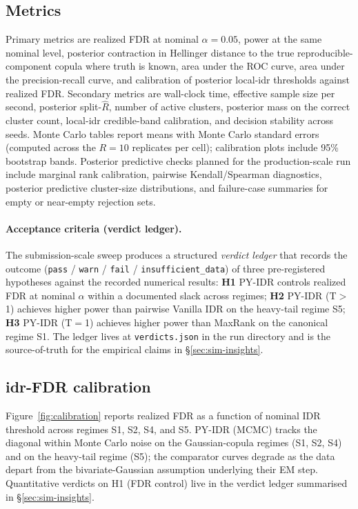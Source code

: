 \subsection{Metrics}
\label{sec:sim-metrics}

Primary metrics are realized FDR at nominal $\alpha=0.05$, power at the same
nominal level, posterior contraction in Hellinger distance to the true
reproducible-component copula where truth is known, area under the ROC curve,
area under the precision-recall curve, and calibration of posterior local-idr
thresholds against realized FDR. Secondary metrics are wall-clock time,
effective sample size per second, posterior split-$\widehat R$, number of
active clusters, posterior mass on the correct cluster count, local-idr
credible-band calibration, and decision stability across seeds. Monte Carlo
tables report means with Monte Carlo standard errors (computed across the
$R=10$ replicates per cell); calibration plots include 95\% bootstrap bands.
Posterior predictive checks planned for the production-scale run include
marginal rank calibration, pairwise Kendall/Spearman diagnostics, posterior
predictive cluster-size distributions, and failure-case summaries for empty
or near-empty rejection sets.

\paragraph{Acceptance criteria (verdict ledger).}
The submission-scale sweep produces a structured \emph{verdict ledger} that
records the outcome (\texttt{pass} / \texttt{warn} / \texttt{fail} /
\texttt{insufficient\_data}) of three pre-registered hypotheses against the
recorded numerical results: \textbf{H1} PY-IDR controls realized FDR at
nominal $\alpha$ within a documented slack across regimes; \textbf{H2}
PY-IDR (T$>$1) achieves higher power than pairwise Vanilla IDR on the
heavy-tail regime S5; \textbf{H3} PY-IDR (T$=$1) achieves higher power than
MaxRank on the canonical regime S1. The ledger lives at
\texttt{verdicts.json} in the run directory and is the source-of-truth for
the empirical claims in \S\ref{sec:sim-insights}.

\subsection{idr-FDR calibration}
\label{sec:sim-expected}

Figure~\ref{fig:calibration} reports realized FDR as a function of nominal IDR
threshold across regimes S1, S2, S4, and S5. PY-IDR (MCMC) tracks the diagonal
within Monte Carlo noise on the Gaussian-copula regimes (S1, S2, S4) and on
the heavy-tail regime (S5); the comparator curves degrade as the data depart
from the bivariate-Gaussian assumption underlying their EM step. Quantitative
verdicts on H1 (FDR control) live in the verdict ledger summarised in
\S\ref{sec:sim-insights}.

